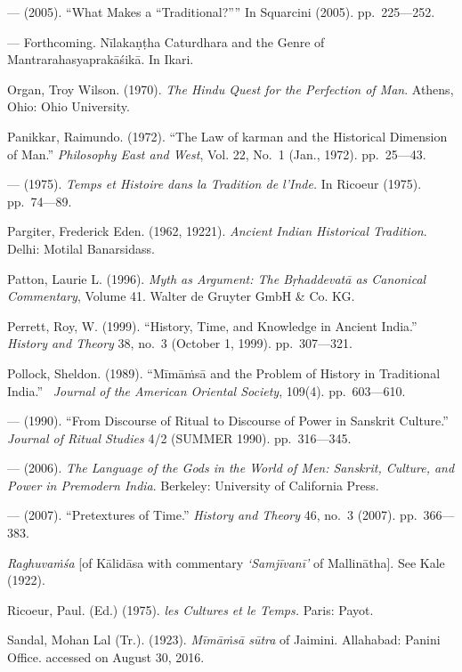 \begin{thebibliography}{99}
  — (2005). “What Makes a “Traditional?”” In Squarcini (2005). pp.~225––252.

  — Forthcoming. Nīlakaṇṭha Caturdhara and the Genre of Mantrarahasyaprakāśikā. In Ikari.

  Organ, Troy Wilson. (1970). \textit{The Hindu Quest for the Perfection of Man}. Athens, Ohio: Ohio University.

  Panikkar, Raimundo. (1972). “The Law of karman and the Historical Dimension of Man.” \textit{Philosophy East and West}, Vol. 22, No.~1 (Jan., 1972). pp.~25––43.

  — (1975). \textit{Temps et Histoire dans la Tradition de l’Inde.} In Ricoeur (1975). pp.~74––89.

  Pargiter, Frederick Eden. (1962, 19221). \textit{Ancient Indian Historical Tradition}. Delhi: Motilal Banarsidass.

  Patton, Laurie L. (1996). \textit{Myth as Argument: The Bṛhaddevatā as Canonical Commentary}, Volume 41. Walter de Gruyter GmbH \& Co. KG.

  Perrett, Roy, W. (1999). “History, Time, and Knowledge in Ancient India.” \textit{History and Theory} 38, no.~3 (October 1, 1999). pp.~307––321.

  Pollock, Sheldon. (1989). “Mīmāṁsā and the Problem of History in Traditional India.”  \textit{Journal of the American Oriental Society}, 109(4). pp.~603––610.

  — (1990). “From Discourse of Ritual to Discourse of Power in Sanskrit Culture.” \textit{Journal of Ritual Studies} 4/2 (SUMMER 1990). pp.~316––345.

  — (2006). \textit{The Language of the Gods in the World of Men: Sanskrit, Culture, and Power in Premodern India}. Berkeley: University of California Press.

  — (2007). “Pretextures of Time.” \textit{History and Theory} 46, no.~3 (2007). pp.~366––383.

  \textit{Raghuvaṁśa} [of Kālidāsa with commentary \textit{‘Samjīvanī’} of Mallinātha]. See Kale (1922).

  Ricoeur, Paul. (Ed.) (1975). \textit{les Cultures et le Temps.} Paris: Payot.

  Sandal, Mohan Lal (Tr.). (1923). \textit{Mīmāṁsā sūtra} of Jaimini. Allahabad: Panini Office. accessed on August 30, 2016.


\end{thebibliography}
